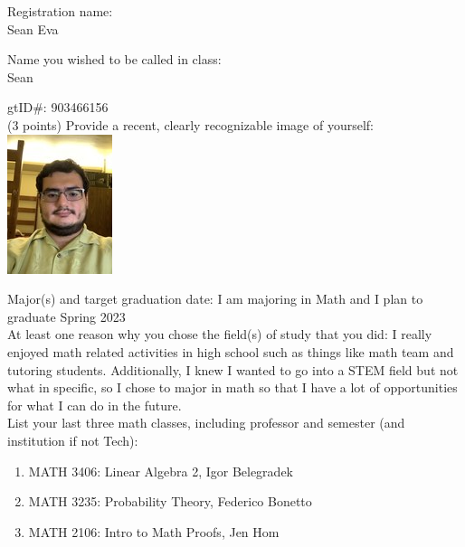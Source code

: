 \documentclass[11pt]{article}
\begin{document}
\bigskip
\bigskip


\noindent Registration name: \\
Sean Eva
\bigskip

\noindent Name you wished to be called in class: \\
Sean
\bigskip

\noindent gtID\#: 903466156	\\

\noindent (3 points) Provide a recent, clearly recognizable image of yourself: \\

\includegraphics{me4.jpg}

\noindent Major(s) and target graduation date: I am majoring in Math and I plan to graduate Spring 2023\\

\noindent At least one reason why you chose the field(s) of study that you did: I really enjoyed math related activities in high school such as things like math team and tutoring students. Additionally, I knew I wanted to go into a STEM field but not what in specific, so I chose to major in math so that I have a lot of opportunities for what I can do in the future.\\


\noindent List your last three math classes, including professor and semester (and institution if not Tech): 
\begin{enumerate}
    \item MATH 3406: Linear Algebra 2, Igor Belegradek
    \item MATH 3235: Probability Theory, Federico Bonetto
    \item MATH 2106: Intro to Math Proofs, Jen Hom
\end{enumerate}
\end{document}
